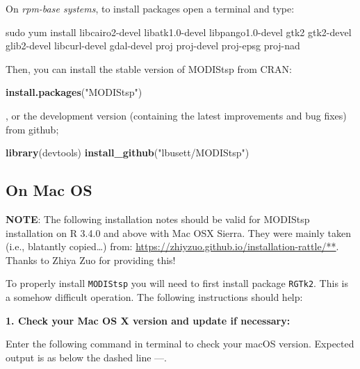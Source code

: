 \documentclass[]{article}
\newenvironment{Shaded}{\begin{snugshade}}{\end{snugshade}}
\newcommand{\KeywordTok}[1]{\textcolor[rgb]{0.13,0.29,0.53}{\textbf{#1}}}
\newcommand{\StringTok}[1]{\textcolor[rgb]{0.31,0.60,0.02}{#1}}
\newcommand{\FunctionTok}[1]{\textcolor[rgb]{0.00,0.00,0.00}{#1}}
\newcommand{\ExtensionTok}[1]{#1}
\newcommand{\NormalTok}[1]{#1}
\begin{document}
On \emph{rpm-base systems}, to install packages open a terminal and
type:

\begin{Shaded}
\begin{Highlighting}[]
\FunctionTok{sudo}\NormalTok{ yum install libcairo2-devel libatk1.0-devel libpango1.0-devel gtk2 gtk2-devel }
\ExtensionTok{glib2-devel}\NormalTok{ libcurl-devel gdal-devel proj proj-devel proj-epsg proj-nad}
\end{Highlighting}
\end{Shaded}

Then, you can install the stable version of MODIStsp from CRAN:

\begin{Shaded}
\begin{Highlighting}[]
\KeywordTok{install.packages}\NormalTok{(}\StringTok{"MODIStsp"}\NormalTok{)}
\end{Highlighting}
\end{Shaded}

, or the development version (containing the latest improvements and bug
fixes) from github;

\begin{Shaded}
\begin{Highlighting}[]
\KeywordTok{library}\NormalTok{(devtools)}
\KeywordTok{install_github}\NormalTok{(}\StringTok{"lbusett/MODIStsp"}\NormalTok{)}
\end{Highlighting}
\end{Shaded}

\subsection{On Mac OS}\label{on-mac-os}

\textbf{NOTE}: The following installation notes should be valid for
MODIStsp installation on R 3.4.0 and above with Mac OSX Sierra. They
were mainly taken (i.e., blatantly copied\ldots{}) from:
\url{https://zhiyzuo.github.io/installation-rattle/**}. Thanks to Zhiya
Zuo for providing this!

To properly install \texttt{MODIStsp} you will need to first install
package \texttt{RGTk2}. This is a somehow difficult operation. The
following instructions should help:

\textbf{1. Check your Mac OS X version and update if necessary: }

Enter the following command in terminal to check your macOS version.
Expected output is as below the dashed line ---.
\end{document}
